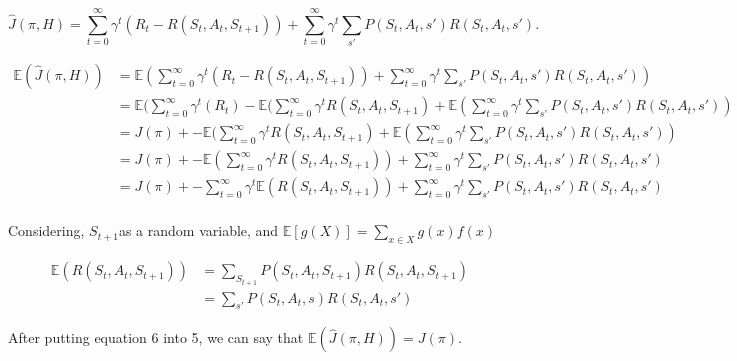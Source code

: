 \documentclass{article}
\begin{document}
\[\hat J(\pi,H) = \sum_{t=0}^\infty \gamma^t \left ( R_t - R(S_t,A_t,S_{t+1})\right ) + \sum_{t=0}^\infty \gamma^t \sum_{s'} P(S_t,A_t,s')R(S_t,A_t,s').\]

\begin{align}
\mathbb E(\hat J(\pi,H)) &= \mathbb E(\sum_{t=0}^\infty \gamma^t \left ( R_t - R(S_t,A_t,S_{t+1})\right ) + \sum_{t=0}^\infty \gamma^t \sum_{s'} P(S_t,A_t,s')R(S_t,A_t,s')) \nonumber\\
				     &= \mathbb E(\sum_{t=0}^\infty \gamma^t ( R_t ) - \mathbb E(\sum_{t=0}^\infty \gamma^t R(S_t,A_t,S_{t+1}) + \mathbb E(\sum_{t=0}^\infty \gamma^t \sum_{s'} P(S_t,A_t,s')R(S_t,A_t,s')) \nonumber\\
				     &= J(\pi) + - \mathbb E(\sum_{t=0}^\infty \gamma^t R(S_t,A_t,S_{t+1}) + \mathbb E(\sum_{t=0}^\infty \gamma^t \sum_{s'} P(S_t,A_t,s')R(S_t,A_t,s')) \nonumber\\
				     &= J(\pi) + - \mathbb E(\sum_{t=0}^\infty \gamma^t R(S_t,A_t,S_{t+1})) + \sum_{t=0}^\infty \gamma^t \sum_{s'} P(S_t,A_t,s')R(S_t,A_t,s') \tag{expectation of a constant is a constant} \nonumber\\
				     &= J(\pi) + - \sum_{t=0}^\infty \gamma^t \mathbb E(R(S_t,A_t,S_{t+1})) + \sum_{t=0}^\infty \gamma^t \sum_{s'} P(S_t,A_t,s')R(S_t,A_t,s') \tag{expectation of a constant is a constant}\\
\end{align}

Considering, $S_{t+1} $as a random variable, and $ \mathbb E [g(X)] = \sum_{x \in X}g(x) f(x) $

\begin{align}
\mathbb E(R(S_t,A_t,S_{t+1})) &= \sum_{S_{t+1}} P(S_t,A_t,S_{t+1})R(S_t,A_t,S_{t+1}) \nonumber\\
							    &= \sum_{s'} P(S_t,A_t,s)R(S_t,A_t,s')
\end{align}

After putting equation 6 into 5, we can say that $ \mathbb E(\hat J(\pi,H)) = J(\pi). $
\end{document}
